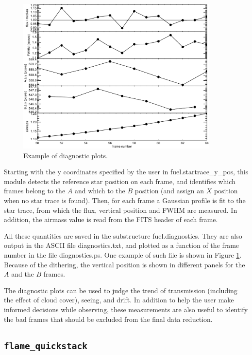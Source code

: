 \documentclass[a4paper, notitlepage]{article}
\begin{document}
\begin{figure}[htbp]
\centering
\includegraphics[width=0.9\textwidth]{diagnostics}
\caption{Example of diagnostic plots.}
\label{fig:diagnostics}
\end{figure}

Starting with the y coordinates specified by the user in fuel.startrace\_y\_pos, this module detects the reference star position on each frame, and identifies which frames belong to the $A$ and which to the $B$ position (and assign an $X$ position when no star trace is found). Then, for each frame a Gaussian profile is fit to the star trace, from which the flux, vertical position and FWHM are measured. In addition, the airmass value is read from the FITS header of each frame.

All these quantities are saved in the substructure fuel.diagnostics. They are also output in the ASCII file diagnostics.txt, and plotted as a function of the frame number in the file diagnostics.ps. One example of such file is shown in Figure \ref{fig:diagnostics}. Because of the dithering, the vertical position is shown in different panels for the $A$ and the $B$ frames.

The diagnostic plots can be used to judge the trend of transmission (including the effect of cloud cover), seeing, and drift. In addition to help the user make informed decisions while observing, these measurements are also useful to identify the bad frames that should be excluded from the final data reduction.



\subsection{\texttt{flame\_quickstack}}
\end{document}
